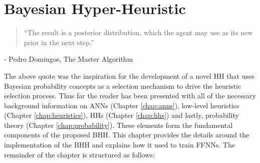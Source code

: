 \chapter{Bayesian Hyper-Heuristic}\label{chap:bhh}

\begin{quotation}
      ``The result is a posterior distribution, which the agent may use as its new prior in the next step.''
\end{quotation}
\begin{flushright}
      - Pedro Domingos, The Master Algorithm
\end{flushright}

The above quote was the inspiration for the development of a novel \acf{HH} that uses Bayesian probability concepts as a selection mechanism to drive the heuristic selection process. Thus far the reader has been presented with all of the necessary background information on \acp{ANN} (Chapter \ref{chap:anns}), low-level heuristics (Chapter \ref{chap:heuristics}), \acp{HH} (Chapter \ref{chap:hhs}) and lastly, probability theory (Chapter \ref{chap:probability}). These elements form the fundamental components of the proposed \Acf{BHH}. This chapter provides the details around the implementation of the \Ac{BHH} and explains how it used to train \acp{FFNN}. The remainder of the chapter is structured as follows:

